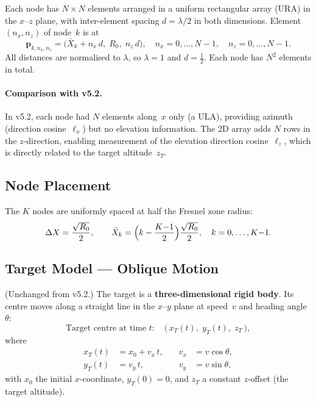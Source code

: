 \documentclass[11pt,a4paper]{article}
\begin{document}
Each node has $N\times N$ elements arranged in a uniform rectangular
array (URA) in the $x$--$z$ plane, with inter-element spacing
$d=\lambda/2$ in both dimensions.  Element $(n_x,n_z)$ of node~$k$ is
at
\begin{equation}
  \mathbf{p}_{k,n_x,n_z}
  = \bigl(\bar{X}_k + n_x\,d,\;R_0,\;n_z\,d\bigr),
  \quad n_x=0,\ldots,N{-}1,\quad n_z=0,\ldots,N{-}1.
  \label{eq:element_pos}
\end{equation}
All distances are normalised to $\lambda$, so $\lambda=1$ and
$d=\tfrac12$.  Each node has $N^2$ elements in total.

\paragraph{Comparison with v5.2.}
In v5.2, each node had $N$ elements along~$x$ only (a ULA), providing
azimuth (direction cosine~$\ell_x$) but no elevation information.
The 2D array adds $N$ rows in the $z$-direction, enabling
measurement of the elevation direction cosine~$\ell_z$, which is
directly related to the target altitude~$z_T$.

\subsection{Node Placement}

The $K$ nodes are uniformly spaced at half the Fresnel zone radius:
\begin{equation}
  \Delta X = \frac{\sqrt{R_0}}{2},
  \qquad
  \bar{X}_k = \Bigl(k - \frac{K{-}1}{2}\Bigr)\frac{\sqrt{R_0}}{2},
  \quad k=0,\ldots,K{-}1.
  \label{eq:node_positions}
\end{equation}

\subsection{Target Model --- Oblique Motion}
\label{sec:target_model}

(Unchanged from v5.2.)
The target is a \textbf{three-dimensional rigid body}.  Its centre
moves along a straight line in the $x$--$y$ plane at speed~$v$ and
heading angle~$\theta$:
\begin{equation}
  \text{Target centre at time } t:\quad
  \bigl(\,x_T(t),\;y_T(t),\;z_T\,\bigr),
  \label{eq:target_pos}
\end{equation}
where
\begin{align}
  x_T(t) &= x_0 + v_x\,t, &\quad v_x &= v\cos\theta,
  \label{eq:xT}\\
  y_T(t) &= v_y\,t,        &\quad v_y &= v\sin\theta,
  \label{eq:yT}
\end{align}
with $x_0$ the initial $x$-coordinate, $y_T(0)=0$, and $z_T$ a
constant $z$-offset (the target altitude).
\end{document}
